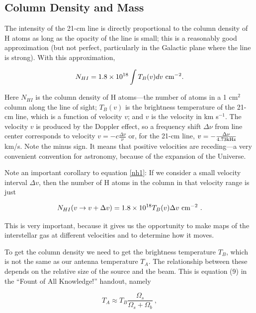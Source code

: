 \documentclass[psfig,preprint]{aastex}
\begin{document}
\subsection{Column Density and Mass} \label{coldensity}

\noindent
	The intensity of the 21-cm line is directly proportional to the
column density of H atoms as long as the opacity of the line is small;
this is a reasonably good approximation (but not perfect, particularly
in the Galactic plane where the line is strong). With this
approximation, 

\begin{equation} \label{nh1}
N_{HI} = 1.8 \times 10^{18} \int T_{B}(v) dv \ {\rm cm^{-2}}. 
\end{equation}

\noindent Here $N_{HI}$ is the column density of H atoms---the number of
atoms in a 1 cm$^2$ column along the line of sight; $T_{B}(v)$ is the
brightness temperature of the 21-cm line, which is a function of 
velocity $v$; and $v$ is the velocity in km s$^{-1}$. The velocity $v$
is produced by the Doppler effect, so a frequency shift $\Delta \nu$
from line center corresponds to velocity $v = - c \frac{\Delta \nu}{\nu}$
or, for the 21-cm line, $v = -\frac{\Delta \nu}{4.73 {\rm kHz}}$ km/s.
Note the minus sign. It means that positive velocities are receding---a
very convenient convention for astronomy, because of the expansion of
the Universe. 

          Note an important corollary to equation \ref{nh1}: If we
consider a small velocity interval $\Delta v$, then the number of H
atoms in the column in that velocity range is just 

\begin{equation} \label{nh2}
N_{HI}(v \rightarrow v + \Delta v) = 1.8 \times 10^{18} T_{B}(v) \Delta
v \ {\rm cm^{-2}} \ .  
\end{equation}

\noindent This is very important, because it gives us the opportunity to
make maps of the interstellar gas at different velocities and to
determine how it moves.

	To get the column density we need to get the brightness
temperature $T_B$, which is not the same as our antenna temperature
$T_A$. The relationship between these depends on the relative size of
the source and the beam. This is equation (9) in the ``Fount of All
Knowledge!'' handout, namely 

\begin{equation} \label{taeqn}
T_A \approx T_B \frac{\Omega_s}{\Omega_s + \Omega_b} \ ,
\end{equation}
\end{document}
